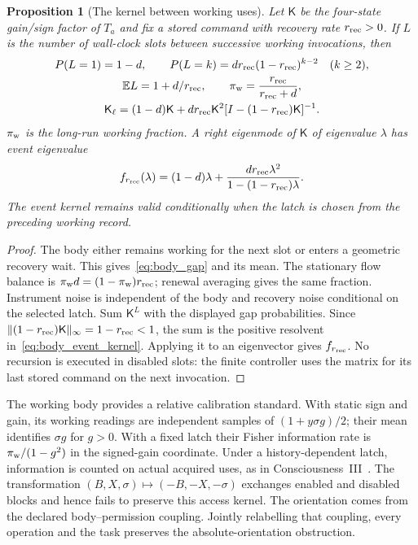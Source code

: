 \documentclass[12pt]{article}
\newtheorem{proposition}[theorem]{Proposition}
\theoremstyle{definition}
\newcommand{\E}{\mathbb E}
\begin{document}
\begin{proposition}[The kernel between working uses]
\label{prop:body_event}
Let $\mathsf K$ be the four-state gain/sign factor of $T_a$ and fix a stored command with recovery rate $r_{\rm rec}>0$. If $L$ is the number of wall-clock slots between successive working invocations, then
\begin{gather}
 P(L=1)=1-d,\qquad
 P(L=k)=d r_{\rm rec}(1-r_{\rm rec})^{k-2}\quad(k\ge2),
 \label{eq:body_gap}\\
 \E L=1+d/r_{\rm rec},\qquad
 \pi_{\rm w}=\frac{r_{\rm rec}}{r_{\rm rec}+d},
 \label{eq:working_fraction}\\
 \mathsf K_\ell=(1-d)\mathsf K+
 d r_{\rm rec}\mathsf K^2[I-(1-r_{\rm rec})\mathsf K]^{-1}.
 \label{eq:body_event_kernel}
\end{gather}
$\pi_{\rm w}$ is the long-run working fraction. A right eigenmode of $\mathsf K$ of eigenvalue $\lambda$ has event eigenvalue
\[
 f_{r_{\rm rec}}(\lambda)=(1-d)\lambda+
 \frac{d r_{\rm rec}\lambda^2}{1-(1-r_{\rm rec})\lambda}.
\]
The event kernel remains valid conditionally when the latch is chosen from the preceding working record.
\end{proposition}
\begin{proof}
The body either remains working for the next slot or enters a geometric recovery wait. This gives~\eqref{eq:body_gap} and its mean. The stationary flow balance is $\pi_{\rm w}d=(1-\pi_{\rm w})r_{\rm rec}$; renewal averaging gives the same fraction. Instrument noise is independent of the body and recovery noise conditional on the selected latch. Sum $\mathsf K^L$ with the displayed gap probabilities. Since $\|(1-r_{\rm rec})\mathsf K\|_\infty=1-r_{\rm rec}<1$, the sum is the positive resolvent in~\eqref{eq:body_event_kernel}. Applying it to an eigenvector gives $f_{r_{\rm rec}}$. No recursion is executed in disabled slots: the finite controller uses the matrix for its last stored command on the next invocation.
\end{proof}

The working body provides a relative calibration standard. With static sign and gain, its working readings are independent samples of $(1+y\sigma g)/2$; their mean identifies $\sigma g$ for $g>0$. With a fixed latch their Fisher information rate is $\pi_{\rm w}/(1-g^2)$ in the signed-gain coordinate. Under a history-dependent latch, information is counted on actual acquired uses, as in Consciousness~III~\cite{Liu2026CIII}. The transformation $(B,X,\sigma)\mapsto(-B,-X,-\sigma)$ exchanges enabled and disabled blocks and hence fails to preserve this access kernel. The orientation comes from the declared body--permission coupling. Jointly relabelling that coupling, every operation and the task preserves the absolute-orientation obstruction.
\end{document}
